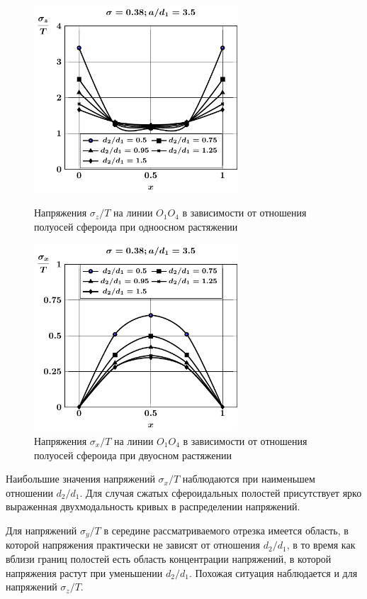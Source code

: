 \begin{figure}[h!]
\centering\footnotesize
\parbox[b]{7.5cm}{\centering\includegraphics[width=7.6cm]{cav4-prolate-oblate-a35-t1-sig_z.pdf}
\caption{Напряжения $\sigma_z/T$ на линии $O_1O_4$ в зависимости от отношения полуосей сфероида при одноосном растяжении
\label{f:10:10}}}\hfil\hfil
\parbox[b]{7.5cm}{\centering\includegraphics[width=7.6cm]{cav4-prolate-oblate-a35-t2-sig_x.pdf}
\caption{Напряжения $\sigma_x/T$ на линии $O_1O_4$ в зависимости от отношения полуосей сфероида при двуосном растяжении
\label{f:10:11}}}
\end{figure}

Наибольшие значения напряжений $\sigma_x/T$ наблюдаются при наименьшем отношении $d_2/d_1$. Для случая сжатых сфероидальных полостей присутствует ярко выраженная двухмодальность кривых в распределении напряжений.

Для напряжений $\sigma_y/T$ в середине рассматриваемого отрезка имеется область, в которой напряжения практически не зависят от отношения $d_2/d_1$, в то время как вблизи границ полостей есть область концентрации напряжений, в которой напряжения растут при уменьшении $d_2/d_1$. Похожая ситуация наблюдается и для напряжений $\sigma_z/T$.

